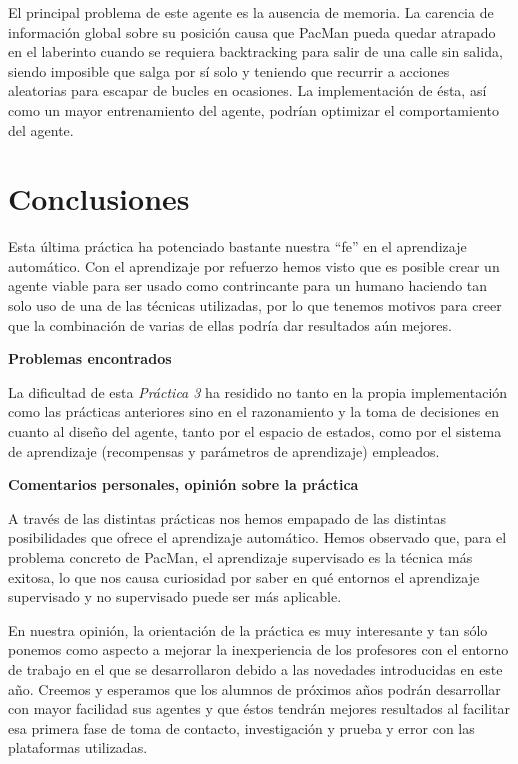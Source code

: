 \documentclass[12pt]{article}
\begin{document}

El principal problema de este agente es la ausencia de memoria. La carencia de información global sobre su posición causa que PacMan pueda quedar atrapado en el laberinto cuando se requiera backtracking para salir de una calle sin salida, siendo imposible que salga por sí solo y teniendo que recurrir a acciones aleatorias para escapar de bucles en ocasiones. La implementación de ésta, así como un mayor entrenamiento del agente, podrían optimizar el comportamiento del agente.

\newpage
\section{Conclusiones}


Esta última práctica ha potenciado bastante nuestra ``fe'' en el aprendizaje automático. Con el aprendizaje por refuerzo hemos visto que es posible crear un agente viable para ser usado como contrincante para un humano haciendo tan solo uso de una de las técnicas utilizadas, por lo que tenemos motivos para creer que la combinación de varias de ellas podría dar resultados aún mejores.

\vspace{0.5cm}
\centerline{\textbf{Problemas encontrados}}
\vspace{0.5cm}

La dificultad de esta \textit{Práctica 3} ha residido no tanto en la propia implementación como las prácticas anteriores sino en el razonamiento y la toma de decisiones en cuanto al diseño del agente, tanto por el espacio de estados, como por el sistema de aprendizaje (recompensas y parámetros de aprendizaje) empleados.

\vspace{0.5cm}
\centerline{\textbf{Comentarios personales, opinión sobre la práctica}}
\vspace{0.5cm}

A través de las distintas prácticas nos hemos empapado de las distintas posibilidades que ofrece el aprendizaje automático. Hemos observado que, para el problema concreto de PacMan, el aprendizaje supervisado es la técnica más exitosa, lo que nos causa curiosidad por saber en qué entornos el aprendizaje supervisado y no supervisado puede ser más aplicable.

En nuestra opinión, la orientación de la práctica es muy interesante y tan sólo ponemos como aspecto a mejorar la inexperiencia de los profesores con el entorno de trabajo en el que se desarrollaron debido a las novedades introducidas en este año. Creemos y esperamos que los alumnos de próximos años podrán desarrollar con mayor facilidad sus agentes y que éstos tendrán mejores resultados al facilitar esa primera fase de toma de contacto, investigación y prueba y error con las plataformas utilizadas.
\end{document}
